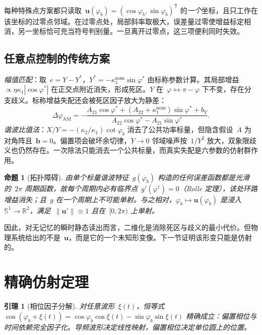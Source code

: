 \documentclass[journal]{IEEEtran}
\theoremstyle{plain}
\newtheorem{lemma}{引理}
\newtheorem{proposition}{命题}
\theoremstyle{remark}
\newcommand{\uv}{\mathbf{u}}
\newcommand{\bv}{\mathbf{b}}
\newcommand{\T}{\mathsf{T}}
\begin{document}
每种特殊点方案都只读取~$\uv(\varphi_b)=(\cos\varphi_b,\sin\varphi_b)^{\T}$ 的\emph{一个}坐标，且只工作在该坐标的过零点邻域。在过零点处，局部斜率取极大，误差量过零使增益标定相消，另一坐标恰可充当符号判别量。一旦离开过零点，这三项便利同时失效。

\subsection{任意点控制的传统方案}
\emph{幅值匹配}：取~$e=Y-Y^\ast$，$Y^\ast=-\kappa_1^{\mathrm{nom}}\sin\varphi^\ast$ 由标称参数计算。其局部增益~$\propto\eta\kappa_1|\cos\varphi^\ast|$ 在正交点附近消失，形成死区。$Y$ 在~$\varphi\leftrightarrow\pi-\varphi$ 下不变，存在分支歧义。标称增益失配还会被死区因子放大为静差：
\begin{equation}
\Delta\varphi_{\mathrm{AM}}
=-\frac{A_{21}\cos\varphi^\ast+(A_{22}{+}\kappa_1^{\mathrm{nom}})
\sin\varphi^\ast+b_Y}{A_{22}\cos\varphi^\ast-A_{21}\sin\varphi^\ast}.
\label{eq:staticAM}
\end{equation}
\emph{谐波比值法}：$X/Y=-(\kappa_2/\kappa_1)\cot\varphi_b$ 消去了公共功率标量，但隐含假设~$A$ 为对角阵且~$\bv=0$。偏置项会破坏余切律，$Y\!\to\!0$ 邻域噪声按~$1/Y^2$ 放大，双象限歧义也仍然存在。一次除法只能消去一个公共标量，而真实失配是六参数的仿射群作用。

\begin{proposition}[拓扑障碍]
\label{prop:rolle}
由单个标量谐波特征~$g(\varphi_b)$ 构造的任何误差函数都是光滑的~$2\pi$ 周期函数，故每个周期内必有临界点~$g'(\varphi^\dagger)=0$（Rolle 定理），该处环路增益消失；且~$g$ 在一个周期上不可能单射。与之相对，$\varphi_b\mapsto\uv(\varphi_b)$ 是浸入~$\mathbb{S}^1\!\to\!\mathbb{R}^2$，满足~$\|\uv'\|\equiv 1$ 且在~$[0,2\pi)$ 上单射。
\end{proposition}

因此，对无记忆的瞬时静态读出而言，二维化是消除死区与歧义的最小代价。但物理系统给出的不是~$\uv$，而是它的一个未知形变像。下一节证明该形变只能是仿射的。

\section{精确仿射定理}
\label{sec:affine}

\begin{lemma}[相位因子分解]
\label{lem:fact}
对任意波形~$\xi(t)$，恒等式
$\cos(\varphi_b+\xi(t))=\cos\varphi_b\cos\xi(t)-\sin\varphi_b\sin\xi(t)$
精确成立：偏置相位与时间依赖完全因子化。导频波形决定线性映射，偏置相位决定单位圆上的位置。
\end{lemma}
\end{document}
